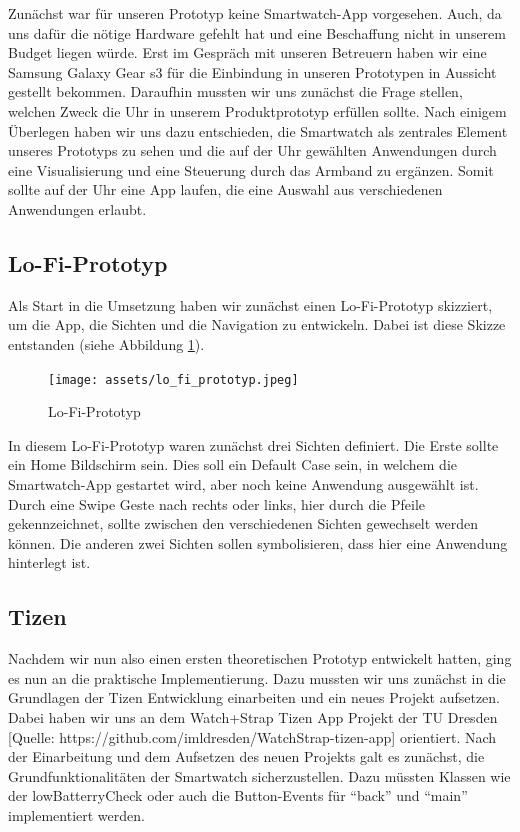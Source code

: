 \documentclass[12pt, a4paper]{article}
\begin{document}
Zunächst war für unseren Prototyp keine Smartwatch-App vorgesehen. Auch, da uns dafür die nötige Hardware gefehlt hat und eine Beschaffung nicht in unserem Budget liegen würde. Erst im Gespräch mit unseren Betreuern haben wir eine Samsung Galaxy Gear s3 für die Einbindung in unseren Prototypen in Aussicht gestellt bekommen. Daraufhin mussten wir uns zunächst die Frage stellen, welchen Zweck die Uhr in unserem Produktprototyp erfüllen sollte. Nach einigem Überlegen haben wir uns dazu entschieden, die Smartwatch als zentrales Element unseres Prototyps zu sehen und die auf der Uhr gewählten Anwendungen durch eine Visualisierung und eine Steuerung durch das Armband zu ergänzen. Somit sollte auf der Uhr eine App laufen, die eine Auswahl aus verschiedenen Anwendungen erlaubt. 

\subsection{Lo-Fi-Prototyp}

Als Start in die Umsetzung haben wir zunächst einen Lo-Fi-Prototyp skizziert, um die App, die Sichten und die Navigation zu entwickeln. Dabei ist diese Skizze entstanden (siehe Abbildung \ref{fig:Smatwatch_Prototyp}).

\begin{figure}[h]
	\centering
	\texttt{[image: assets/lo\_fi\_prototyp.jpeg]}
	\caption{Lo-Fi-Prototyp}
	\label{fig:Smatwatch_Prototyp}
\end{figure}

In diesem Lo-Fi-Prototyp waren zunächst drei Sichten definiert. Die Erste sollte ein Home Bildschirm sein. Dies soll ein Default Case sein, in welchem die Smartwatch-App gestartet wird, aber noch keine Anwendung ausgewählt ist. Durch eine Swipe Geste nach rechts oder links, hier durch die Pfeile gekennzeichnet, sollte zwischen den verschiedenen Sichten gewechselt werden können. Die anderen zwei Sichten sollen symbolisieren, dass hier eine Anwendung hinterlegt ist. 

\subsection{Tizen}

Nachdem wir nun also einen ersten theoretischen Prototyp entwickelt hatten, ging es nun an die praktische Implementierung. Dazu mussten wir uns zunächst in die Grundlagen der Tizen Entwicklung einarbeiten und ein neues Projekt aufsetzen. Dabei haben wir uns an dem Watch+Strap Tizen App Projekt der TU Dresden [Quelle: https://github.com/imldresden/WatchStrap-tizen-app] orientiert. 
Nach der Einarbeitung und dem Aufsetzen des neuen Projekts galt es zunächst, die Grundfunktionalitäten der Smartwatch sicherzustellen. Dazu müssten Klassen wie der lowBatterryCheck oder auch die Button-Events für “back” und “main” implementiert werden. 
\end{document}
